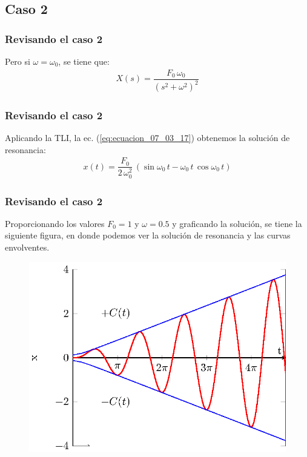 \subsection*{Caso 2}

\begin{frame}
\frametitle{Revisando el caso 2}
Pero si $\omega = \omega_{0}$, se tiene que:
\pause
\begin{align*}
X(s) = \dfrac{F_{0} \, \omega_{0}}{(s^{2} + \omega^{2})^{2}}
\end{align*}
\end{frame}
\begin{frame}
\frametitle{Revisando el caso 2}    
Aplicando la TLI, la ec. (\ref{eq:ecuacion_07_03_17}) obtenemos la solución de resonancia:
\pause
\begin{align}
x(t) = \dfrac{F_{0}}{2 \, \omega_{0}^{2}} \, (\sin \omega_{0} \, t - \omega_{0} \, t \, \cos \omega_{0} \, t )
\label{eq:ecuacion_07_03_18}
\end{align}
\end{frame}
\begin{frame}
\frametitle{Revisando el caso 2}
Proporcionando los valores $F_{0} = 1$ y $\omega = 0.5$ y graficando la solución, se tiene la siguiente figura, en donde podemos ver la solución de resonancia y las curvas envolventes.
\end{frame}
\begin{frame}[plain]
\begin{figure}[H]
    \centering
    \includegraphics[scale=1]{Imagenes/sist_masa_resorte_resonancia_plot_01.eps}
    \label{fig_figura_07_03_04}
\end{figure}
\end{frame}
